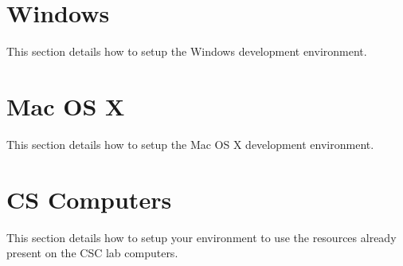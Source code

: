 \documentclass{article}
\begin{document}
\section{Windows}
This section details how to setup the Windows development environment.


\section{Mac OS X}
This section details how to setup the Mac OS X development environment.


\section{CS Computers}
This section details how to setup your environment to use the resources already present on the CSC
lab computers.

\end{document}
